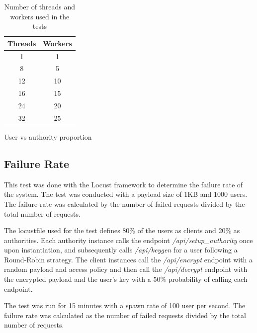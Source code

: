 \documentclass[cic,tc,english]{iiufrgs}
\begin{document}
        \begin{table}
            \centering
            \begin{tabular}{|c|c|}
                \hline
                \textbf{Threads} & \textbf{Workers} \\ \hline
                1 & 1 \\ \hline
                8 & 5 \\ \hline
                12 & 10 \\ \hline
                16 & 15 \\ \hline
                24 & 20 \\ \hline    
                32 & 25 \\ \hline
            \end{tabular}
            \caption{Number of threads and workers used in the tests}
            \label{tab:threads_workers}
        \end{table}
        
        User vs authority proportion

        \subsection{Failure Rate}
            \label{sec:failurerate}
            This test was done with the Locust framework to determine the failure rate of the system. The test was conducted with a payload size of 1KB and 1000 users. The failure rate was calculated by the number of failed requests divided by the total number of requests.

            The locustfile used for the test defines 80\% of the users as clients and 20\% as authorities. Each authority instance calls the endpoint \emph{/api/setup\_authority} once upon instantiation, and subsequently calls \emph{/api/keygen} for a user following a Round-Robin strategy. The client instances call the \emph{/api/encrypt} endpoint with a random payload and access policy and then call the \emph{/api/decrypt} endpoint with the encrypted payload and the user's key with a 50\% probability of calling each endpoint.
            
            The test was run for 15 minutes with a spawn rate of 100 user per second. The failure rate was calculated as the number of failed requests divided by the total number of requests.
\end{document}
